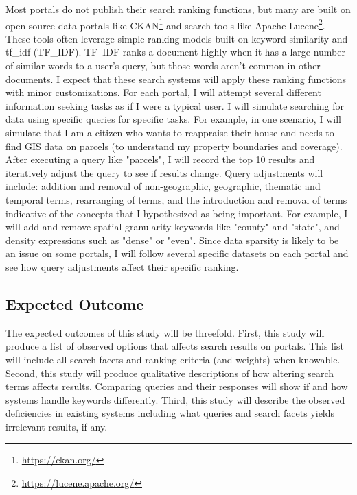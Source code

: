 Most portals do not publish their search ranking functions, but many are built on open source data portals like CKAN\footnote{\url{https://ckan.org/}} and search tools like Apache Lucene\footnote{\url{https://lucene.apache.org/}}. These tools often leverage simple ranking models built on keyword similarity and \gls{tf_idf} (\acrshort{TF_IDF}). TF–IDF ranks a document highly when it has a large number of similar words to a user's query, but those words aren't common in other documents. I expect that these search systems will apply these ranking functions with minor customizations. For each portal, I will attempt several different information seeking tasks as if I were a typical user. I will simulate searching for data using specific queries for specific tasks. For example, in one scenario, I will simulate that I am a citizen who wants to reappraise their house and needs to find GIS data on parcels (to understand my property boundaries and coverage). After executing a query like "parcels", I will record the top 10 results and iteratively adjust the query to see if results change. Query adjustments will include: addition and removal of non-geographic, geographic, thematic and temporal terms, rearranging of terms, and the introduction and removal of terms indicative of the concepts that I hypothesized as being important. For example, I will add and remove spatial granularity keywords like "county" and "state", and density expressions such as "dense" or "even". Since data sparsity is likely to be an issue on some portals, I will follow several specific datasets on each portal and see how query adjustments affect their specific ranking.

\subsection{Expected Outcome}
The expected outcomes of this study will be threefold. First, this study will produce a list of observed options that affects search results on portals. This list will include all search facets and ranking criteria (and weights) when knowable. Second, this study will produce qualitative descriptions of how altering search terms affects results. Comparing queries and their responses will show if and how systems handle keywords differently. Third, this study will describe the observed deficiencies in existing systems including what queries and search facets yields irrelevant results, if any.

